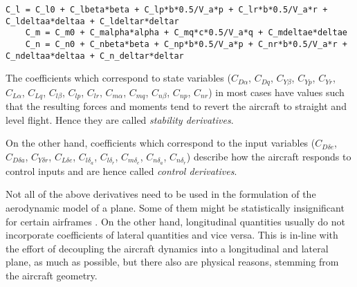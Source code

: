 \begin{lstlisting}[style=C-style]
	C_l = C_l0 + C_lbeta*beta + C_lp*b*0.5/V_a*p + C_lr*b*0.5/V_a*r + C_ldeltaa*deltaa + C_ldeltar*deltar
	C_m = C_m0 + C_malpha*alpha + C_mq*c*0.5/V_a*q + C_mdeltae*deltae
	C_n = C_n0 + C_nbeta*beta + C_np*b*0.5/V_a*p + C_nr*b*0.5/V_a*r + C_ndeltaa*deltaa + C_n_deltar*deltar
\end{lstlisting}

The coefficients which correspond to state variables ($C_{D\alpha}$, $C_{Dq}$, $C_{Y\beta}$, $C_{Yp}$, $C_{Yr}$, $C_{L\alpha}$, $C_{Lq}$, $C_{l\beta}$,
$C_{lp}$, $C_{lr}$, $C_{m\alpha}$, $C_{mq}$, $C_{n\beta}$, $C_{np}$, $C_{nr}$) in most cases have values such that the resulting forces and moments tend to revert the aircraft to straight and level flight. Hence they are called \emph{stability derivatives}.

On the other hand, coefficients which correspond to the input variables ($C_{D\delta e}$, $C_{D\delta a}$, $ C_{Y\delta r}$,
 $C_{L\delta e}$, $C_{l\delta_a}$, $C_{l\delta_r}$, $C_{m\delta_e}$, $C_{n\delta_a}$, $C_{n \delta_r}$) describe how the aircraft responds to control inputs and are hence called \emph{control derivatives}.


Not all of the above derivatives need to be used in the formulation of the aerodynamic model of a plane. Some of them might be statistically insignificant for certain airframes \cite{Klein2006}. On the other hand, longitudinal quantities usually do not incorporate coefficients of lateral quantities and vice versa. This is in-line with the effort of decoupling the aircraft dynamics into a longitudinal and lateral plane, as much as possible, but there also are physical reasons, stemming from the aircraft geometry.